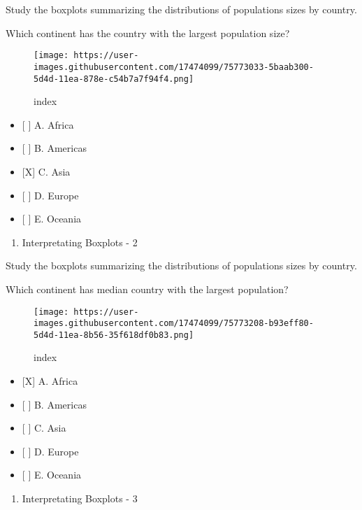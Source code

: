 \documentclass[]{article}
\providecommand{\tightlist}{%
  \setlength{\itemsep}{0pt}\setlength{\parskip}{0pt}}
\begin{document}
Study the boxplots summarizing the distributions of populations sizes by
country.

Which continent has the country with the largest population size?

\begin{figure}
\centering
\texttt{[image: https://user-images.githubusercontent.com/17474099/75773033-5baab300-5d4d-11ea-878e-c54b7a7f94f4.png]}
\caption{index}
\end{figure}

\begin{itemize}
\tightlist
\item
  {[} {]} A. Africa
\item
  {[} {]} B. Americas
\item
  {[}X{]} C. Asia
\item
  {[} {]} D. Europe
\item
  {[} {]} E. Oceania
\end{itemize}

\begin{enumerate}
\def\labelenumi{\arabic{enumi}.}
\setcounter{enumi}{3}
\tightlist
\item
  Interpretating Boxplots - 2
\end{enumerate}

Study the boxplots summarizing the distributions of populations sizes by
country.

Which continent has median country with the largest population?

\begin{figure}
\centering
\texttt{[image: https://user-images.githubusercontent.com/17474099/75773208-b93eff80-5d4d-11ea-8b56-35f618df0b83.png]}
\caption{index}
\end{figure}

\begin{itemize}
\tightlist
\item
  {[}X{]} A. Africa
\item
  {[} {]} B. Americas
\item
  {[} {]} C. Asia
\item
  {[} {]} D. Europe
\item
  {[} {]} E. Oceania
\end{itemize}

\begin{enumerate}
\def\labelenumi{\arabic{enumi}.}
\setcounter{enumi}{4}
\tightlist
\item
  Interpretating Boxplots - 3
\end{enumerate}
\end{document}
